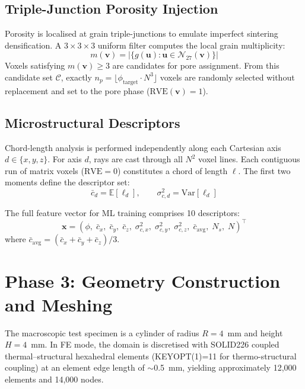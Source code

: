 \documentclass[11pt,a4paper]{article}
\begin{document}
\subsection{Triple-Junction Porosity Injection}

Porosity is localised at grain triple-junctions to emulate imperfect sintering densification. A $3 \times 3 \times 3$ uniform filter computes the local grain multiplicity:
\begin{equation}
    m(\mathbf{v}) = |\{g(\mathbf{u}) : \mathbf{u} \in \mathcal{N}_{27}(\mathbf{v})\}|
\end{equation}
Voxels satisfying $m(\mathbf{v}) \geq 3$ are candidates for pore assignment. From this candidate set $\mathcal{C}$, exactly $n_p = \lfloor \phi_{\text{target}} \cdot N^3 \rfloor$ voxels are randomly selected without replacement and set to the pore phase ($\text{RVE}(\mathbf{v}) = 1$).

\subsection{Microstructural Descriptors}
\label{sec:descriptors}

Chord-length analysis is performed independently along each Cartesian axis $d \in \{x, y, z\}$. For axis $d$, rays are cast through all $N^2$ voxel lines. Each contiguous run of matrix voxels ($\text{RVE} = 0$) constitutes a chord of length $\ell$. The first two moments define the descriptor set:
\begin{equation}
    \bar{c}_d = \mathbb{E}[\ell_d], \qquad \sigma^2_{c,d} = \text{Var}[\ell_d]
\end{equation}

The full feature vector for ML training comprises 10 descriptors:
\begin{equation}
    \mathbf{x} = \left(\phi,\; \bar{c}_x,\; \bar{c}_y,\; \bar{c}_z,\; \sigma^2_{c,x},\; \sigma^2_{c,y},\; \sigma^2_{c,z},\; \bar{c}_{\text{avg}},\; N_s,\; N\right)^{\top}
    \label{eq:features}
\end{equation}
where $\bar{c}_{\text{avg}} = (\bar{c}_x + \bar{c}_y + \bar{c}_z)/3$.

\section{Phase 3: Geometry Construction and Meshing}
\label{sec:phase3}

The macroscopic test specimen is a cylinder of radius $R = 4$~\si{mm} and height $H = 4$~\si{mm}. In FE mode, the domain is discretised with SOLID226 coupled thermal--structural hexahedral elements (KEYOPT(1)=11 for thermo-structural coupling) at an element edge length of $\sim$\SI{0.5}{mm}, yielding approximately 12,000 elements and 14,000 nodes.
\end{document}
